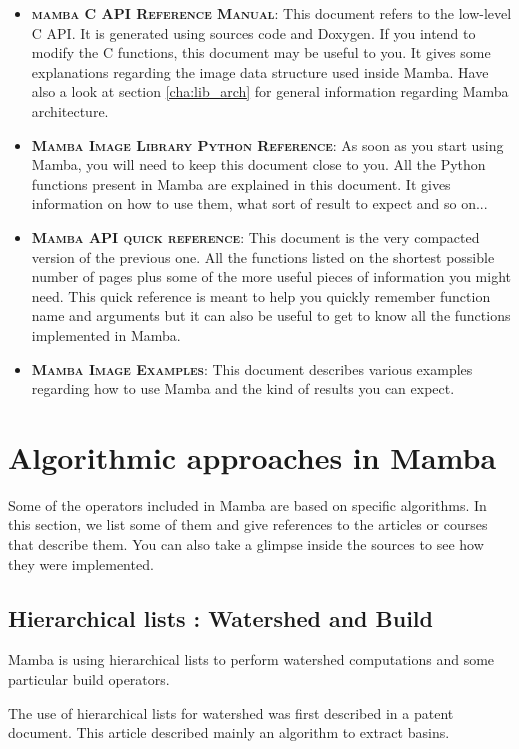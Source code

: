 \documentclass[a4paper,10pt,oneside]{article}
\begin{document}
\begin{itemize}
\item \textbf{\textsc{mamba C API Reference Manual}}: This document refers to the
low-level C API. It is generated using sources code and Doxygen. If you intend 
to modify the C functions, this document may be useful to you. It gives some
explanations regarding the image data structure used inside Mamba. Have also
a look at section \ref{cha:lib_arch} for general information regarding Mamba
architecture.
\item \textbf{\textsc{Mamba Image Library Python Reference}}: As soon as you
start using Mamba, you will need to keep this document close to you. All the
Python functions present in Mamba are explained in this document. It gives
information on how to use them, what sort of result to expect and so on... 
\item \textbf{\textsc{Mamba API quick reference}}: This document is the very
compacted version of the previous one. All the functions listed on the shortest
possible number of pages plus some of the more useful pieces of information you
might need. This quick reference is meant to help you quickly remember function
name and arguments but it can also be useful to get to know all the functions
implemented in Mamba.
\item \textbf{\textsc{Mamba Image Examples}}: This document describes various
examples regarding how to use Mamba and the kind of results you can expect.
\end{itemize}

\pagebreak

\section{Algorithmic approaches in Mamba}

Some of the operators included in Mamba are based on specific algorithms.
In this section, we list some of them and give references to the articles or 
courses that describe them. You can also take a glimpse inside the sources to
see how they were implemented.

\subsection{Hierarchical lists : Watershed and Build}

Mamba is using hierarchical lists to perform watershed computations and some
particular build operators.

The use of hierarchical lists for watershed was first described in a patent 
document. This article described mainly an algorithm to extract basins.
\end{document}
